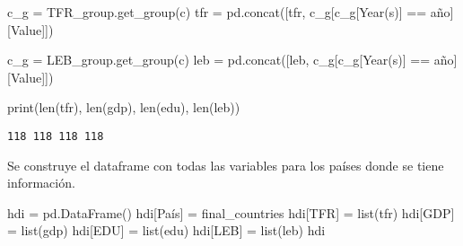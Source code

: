 \documentclass[
  letterpaper,
  DIV=11,
  numbers=noendperiod]{scrreprt}
\newenvironment{Shaded}{\begin{snugshade}}{\end{snugshade}}
\newcommand{\BuiltInTok}[1]{\textcolor[rgb]{0.00,0.23,0.31}{#1}}
\newcommand{\NormalTok}[1]{\textcolor[rgb]{0.00,0.23,0.31}{#1}}
\newcommand{\OperatorTok}[1]{\textcolor[rgb]{0.37,0.37,0.37}{#1}}
\newcommand{\StringTok}[1]{\textcolor[rgb]{0.13,0.47,0.30}{#1}}
\begin{document}
\begin{Shaded}
\begin{Highlighting}[]
\NormalTok{        c\_g }\OperatorTok{=}\NormalTok{ TFR\_group.get\_group(c)}
\NormalTok{        tfr }\OperatorTok{=}\NormalTok{ pd.concat([tfr, c\_g[c\_g[}\StringTok{\textquotesingle{}Year(s)\textquotesingle{}}\NormalTok{] }\OperatorTok{==}\NormalTok{ año][}\StringTok{\textquotesingle{}Value\textquotesingle{}}\NormalTok{]])}
        
\NormalTok{        c\_g }\OperatorTok{=}\NormalTok{ LEB\_group.get\_group(c)}
\NormalTok{        leb }\OperatorTok{=}\NormalTok{ pd.concat([leb, c\_g[c\_g[}\StringTok{\textquotesingle{}Year(s)\textquotesingle{}}\NormalTok{] }\OperatorTok{==}\NormalTok{ año][}\StringTok{\textquotesingle{}Value\textquotesingle{}}\NormalTok{]])}
\end{Highlighting}
\end{Shaded}

\begin{Shaded}
\begin{Highlighting}[]
\BuiltInTok{print}\NormalTok{(}\BuiltInTok{len}\NormalTok{(tfr), }\BuiltInTok{len}\NormalTok{(gdp), }\BuiltInTok{len}\NormalTok{(edu), }\BuiltInTok{len}\NormalTok{(leb))}
\end{Highlighting}
\end{Shaded}

\begin{verbatim}
118 118 118 118
\end{verbatim}

Se construye el dataframe con todas las variables para los países donde
se tiene información.

\begin{Shaded}
\begin{Highlighting}[]
\NormalTok{hdi }\OperatorTok{=}\NormalTok{ pd.DataFrame()}
\NormalTok{hdi[}\StringTok{\textquotesingle{}País\textquotesingle{}}\NormalTok{] }\OperatorTok{=}\NormalTok{ final\_countries}
\NormalTok{hdi[}\StringTok{\textquotesingle{}TFR\textquotesingle{}}\NormalTok{] }\OperatorTok{=} \BuiltInTok{list}\NormalTok{(tfr)}
\NormalTok{hdi[}\StringTok{\textquotesingle{}GDP\textquotesingle{}}\NormalTok{] }\OperatorTok{=} \BuiltInTok{list}\NormalTok{(gdp)}
\NormalTok{hdi[}\StringTok{\textquotesingle{}EDU\textquotesingle{}}\NormalTok{] }\OperatorTok{=} \BuiltInTok{list}\NormalTok{(edu)}
\NormalTok{hdi[}\StringTok{\textquotesingle{}LEB\textquotesingle{}}\NormalTok{] }\OperatorTok{=} \BuiltInTok{list}\NormalTok{(leb)}
\NormalTok{hdi}
\end{Highlighting}
\end{Shaded}
\end{document}
